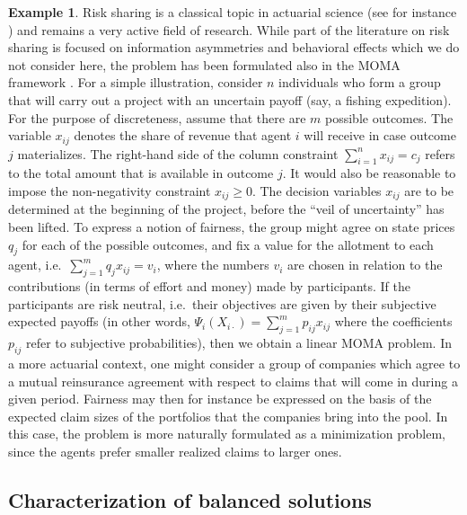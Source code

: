 \documentclass{article}
\theoremstyle{definition}
\newtheorem{example}[theorem]{Example}
\begin{document}
\begin{example} \label{revenue}
Risk sharing is a classical topic in actuarial science (see for instance \cite{Rotar}) and remains a very active field of research. While part of the literature on risk sharing is focused on information asymmetries and behavioral effects which we do not consider here, the problem has been formulated also in the MOMA framework \cite{Buehlmann79}. For a simple illustration,
consider $n$ individuals who form a group that will carry out a project with an uncertain payoff (say, a fishing expedition). For the purpose of discreteness, assume that there are $m$ possible outcomes. The variable $x_{ij}$ denotes the share of revenue that agent $i$ will receive in case outcome $j$ materializes. The right-hand side of the column constraint $\sum_{i=1}^n x_{ij} = c_j$ refers to the total amount that is available in outcome $j$. It would also be reasonable to impose the non-negativity constraint $x_{ij} \geq 0$. The decision variables $x_{ij}$ are to be determined at the beginning of the project, before the ``veil of uncertainty'' has been lifted. To express a notion of fairness, the group might agree on state prices $q_j$ for each of the possible outcomes, and fix a value for the allotment to each agent, i.e.\ $\sum_{j=1}^m q_j x_{ij} = v_i$, where the numbers $v_i$ are chosen in relation to the contributions (in terms of effort and money) made by participants. If the participants are risk neutral, i.e.\ their objectives are given by their subjective expected payoffs (in other words, $\Psi_i(X_{i\cdot}) = \sum_{j=1}^m p_{ij}x_{ij}$ where the coefficients $p_{ij}$ refer to subjective probabilities), then we obtain a linear MOMA problem. In a more actuarial context, one might consider a group of companies which agree to a mutual reinsurance agreement with respect to claims that will come in during a given period. Fairness may then for instance be expressed on the basis of the expected claim sizes of the portfolios that the companies bring into the pool. In this case, the problem is more naturally formulated as a minimization problem, since the agents prefer smaller realized claims to larger ones.
\end{example}

\subsection{Characterization of balanced solutions} \label{character}
\end{document}
